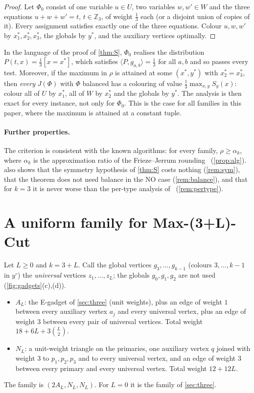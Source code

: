 \documentclass[11pt,letterpaper]{article}
\theoremstyle{remark}
\newcommand{\Z}{\mathbb{Z}}
\newcommand{\yc}{y^{\circ}}
\begin{document}
\begin{proof}
Let $\Phi_0$ consist of one variable $u\in U$, two variables $w,w'\in W$ and the three equations
$u+w+w'=t$, $t\in\Z_3$, of weight $\frac13$ each (or a disjoint union of copies of it). Every assignment
satisfies exactly one of the three equations. Colour $u,w,w'$ by $x^\ast_1,x^\ast_2,x^\ast_3$, the globals by
$y^\ast$, and the auxiliary vertices optimally.
\end{proof}

In the language of the proof of \cref{thm:S}, $\Phi_0$ realises the distribution
$P(t,x)=\frac13[x=x^\ast]$, which satisfies $\langle P,g_{a,b}\rangle=\frac13$ for all $a,b$ and so passes
every test. Moreover, if the maximum in $\rho$ is attained at some $(x^\ast,y^\ast)$ with $x^\ast_2=x^\ast_3$, then
\emph{every} $J(\Phi)$ with $\Phi$ balanced has a colouring of value $\frac13\max_{x,y}S_y(x)$: colour all
of $U$ by $x^\ast_1$, all of $W$ by $x^\ast_2$ and the globals by $y^\ast$. The analysis is then exact for
every instance, not only for $\Phi_0$. This is the case for all families in this paper, where the maximum
is attained at a constant tuple.

\paragraph{Further properties.}
The criterion is consistent with the known algorithms: for every family, $\rho\ge\alpha_k$, where
$\alpha_k$ is the approximation ratio of the Frieze--Jerrum rounding~\cite{FJ97,dKPW04}
(\cref{prop:alg}).  also shows that the symmetry hypothesis of \cref{thm:S} costs nothing
(\cref{rem:sym}), that the theorem does not need balance in the NO case (\cref{rem:balance}), and that for
$k=3$ it is never worse than the per-type analysis of~\cite{NRT25} (\cref{rem:pertype}).

\section{A uniform family for Max-(3+L)-Cut}\label{sec:family}

Let $L\ge 0$ and $k=3+L$. Call the global vertices $g_3,\dots,g_{k-1}$ (colours $3,\dots,k-1$ in $\yc$)
the \emph{universal} vertices $z_1,\dots,z_L$; the globals $g_0,g_1,g_2$ are not used (\cref{fig:gadgets}(c),(d)).

\begin{itemize}
\item $A_L$: the E-gadget of \cref{sec:three} (unit weights), plus an edge of weight $1$ between every
auxiliary vertex $a_j$ and every universal vertex, plus an edge of weight $3$ between every pair of
universal vertices. Total weight $18+6L+3\binom L2$.
\item $N_L$: a unit-weight triangle on the primaries, one auxiliary vertex $q$ joined with weight $3$ to
$p_1,p_2,p_3$ and to every universal vertex, and an edge of weight $3$ between every primary and every
universal vertex. Total weight $12+12L$.
\end{itemize}
The family is $(2A_L, N_L, N_L)$. For $L=0$ it is the family of \cref{sec:three}.
\end{document}
